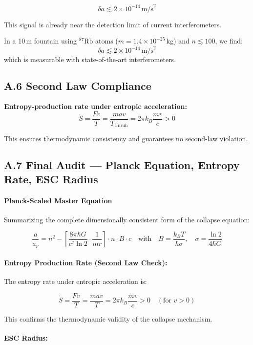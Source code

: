 \documentclass[12pt]{article}
\begin{document}
\[
\delta a \lesssim 2 \times 10^{-14} \, \text{m/s}^2
\]

This signal is already near the detection limit of current interferometers.

In a 10 m fountain using \(^{87}\text{Rb}\) atoms (\( m = 1.4 \times 10^{-25} \) kg) and \( n \lesssim 100 \), we find:
\[
\delta a \lesssim 2 \times 10^{-14} \, \text{m/s}^2
\]
which is measurable with state-of-the-art interferometers.

\subsection*{A.6 Second Law Compliance}
\noindent
\textbf{Entropy-production rate under entropic acceleration:}
\[
\dot{S} = \frac{Fv}{T} = \frac{ma v}{T_{\text{Unruh}}} = 2\pi k_B \frac{m v}{c} > 0
\]

This ensures thermodynamic consistency and guarantees no second-law violation.

\subsection*{A.7 Final Audit — Planck Equation, Entropy Rate, ESC Radius}

\paragraph{Planck-Scaled Master Equation}

Summarizing the complete dimensionally consistent form of the collapse equation:

\[
\boxed{
\frac{a}{a_p} = n^2 - \left[ \frac{8 \pi \hbar G}{c^7 \ln 2} \cdot \frac{1}{m r} \right] \cdot n \cdot B \cdot c
}
\quad \text{with} \quad B = \frac{k_B T}{\hbar \sigma}, \quad \sigma = \frac{\ln 2}{4\hbar G}
\]

\paragraph{Entropy Production Rate (Second Law Check):}

The entropy rate under entropic acceleration is:

\[
\dot{S} = \frac{F v}{T} = \frac{m a v}{T} = 2\pi k_B \frac{m v}{c} > 0 \quad (\text{for } v > 0)
\]

This confirms the thermodynamic validity of the collapse mechanism.

\paragraph{ESC Radius:}
\end{document}
